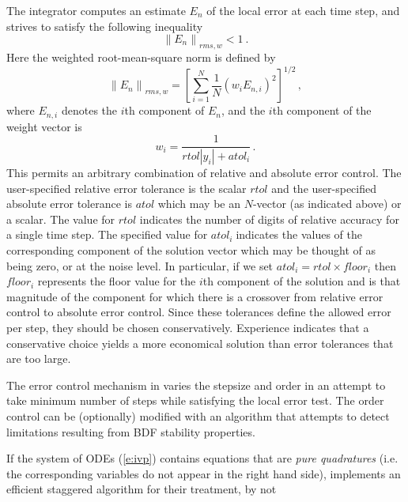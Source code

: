The integrator computes an estimate $E_{n}$ of the local error at each time
step, and strives to satisfy the following inequality
\begin{equation*}%
\left\| E_n\right\|_{rms,w} < 1 ~.
\end{equation*}
Here the weighted root-mean-square norm is defined by
\begin{equation}\label{e:rms}
\left\| E_n\right\|_{rms,w}=\left[ \sum_{i=1}^N\frac{1}{N}\left(
w_iE_{n,i}\right) ^2\right] ^{1/2} \, ,
\end{equation}
where $E_{n,i}$ denotes the $i$th component of $E_n$, and the $i$th 
component of the weight vector is 
\begin{equation}\label{e:weight}
w_i=\frac{1}{rtol|y_i|+atol_i} \,.
\end{equation}
This permits an arbitrary combination of relative and absolute error control.
The user-specified relative error tolerance is the scalar $rtol$ and the
user-specified absolute error tolerance is $atol$ which may be an $N$-vector
(as indicated above) or a scalar. The value for $rtol$
indicates the number of digits of relative accuracy for a single time step.
The specified value for $atol_{i}\;$indicates the values of the
corresponding component of the solution vector which may be thought of as
being zero, or at the noise level. In particular, if we set 
$atol_i=rtol\times floor_i$ then $floor_i$ represents the floor value for the 
$i$th component of the solution and is that magnitude of the component for
which there is a crossover from relative error control to absolute error
control. Since these tolerances define the allowed error per step, they
should be chosen conservatively. Experience indicates that a conservative
choice yields a more economical solution than error tolerances that are too
large.

The error control mechanism in {\cvode} varies the stepsize and order
in an attempt to take minimum number of steps while satisfying the local
error test. The order control can be (optionally) modified with an algorithm
that attempts to detect limitations resulting from BDF stability properties.

If the system of ODEs (\ref{e:ivp}) contains equations that are {\em pure quadratures}
(i.e. the corresponding variables do not appear in the right hand side),
{\cvode} implements an efficient staggered algorithm for their treatment, by not

